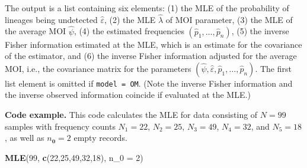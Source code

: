 \documentclass[
]{article}
\newenvironment{Shaded}{\begin{snugshade}}{\end{snugshade}}
\newcommand{\AttributeTok}[1]{\textcolor[rgb]{0.13,0.29,0.53}{#1}}
\newcommand{\DecValTok}[1]{\textcolor[rgb]{0.00,0.00,0.81}{#1}}
\newcommand{\FunctionTok}[1]{\textcolor[rgb]{0.13,0.29,0.53}{\textbf{#1}}}
\newcommand{\NormalTok}[1]{#1}
\begin{document}
The output is a list containing six elements: (1) the MLE of the
probability of lineages being undetected \(\hat\varepsilon\), (2) the
MLE \(\hat \lambda\) of MOI parameter, (3) the MLE of the average MOI
\(\hat \psi\), (4) the estimated frequencies
\((\hat p_1,\ldots, \hat p_n)\), (5) the inverse Fisher information
estimated at the MLE, which is an estimate for the covariance of the
estimator, and (6) the inverse Fisher information adjusted for the
average MOI, i.e., the covariance matrix for the parameters
\((\hat \psi,\hat\varepsilon, \hat p_1,\ldots, \hat p_n)\). The first
list element is omitted if
\texttt{model\ =\ \textquotesingle{}OM\textquotesingle{}}. (Note the
inverse Fisher information and the inverse observed information coincide
if evaluated at the MLE.)

\textbf{Code example.} This code calculates the MLE for data consisting
of \(N=99\) samples with frequency counts \(N_1=22\), \(N_2=25\),
\(N_3=49\), \(N_4=32\), and \(N_5=18\), as well as \(n_{\pmb 0} = 2\)
empty records.

\begin{Shaded}
\begin{Highlighting}[]
\FunctionTok{MLE}\NormalTok{(}\DecValTok{99}\NormalTok{, }\FunctionTok{c}\NormalTok{(}\DecValTok{22}\NormalTok{,}\DecValTok{25}\NormalTok{,}\DecValTok{49}\NormalTok{,}\DecValTok{32}\NormalTok{,}\DecValTok{18}\NormalTok{), }\AttributeTok{n\_0 =} \DecValTok{2}\NormalTok{)}
\end{Highlighting}
\end{Shaded}
\end{document}
